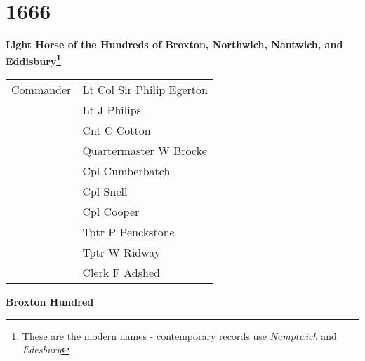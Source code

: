 \chapter*{1666}

\vspace*{10mm}

\begin{center}
  \Large
  \textbf{Light Horse of the Hundreds of Broxton, Northwich, Nantwich, and Eddisbury\footnote{These are the modern names - contemporary records use \textit{Namptwich} and \textit{Edesbury}}}
\end{center}

\begin{center}
  \begin{tabular}{rl}
    Commander & Lt Col Sir Philip Egerton \\
    & Lt J Philips \\
    & Cnt C Cotton \\
    & Quartermaster W Brocke \\
    & Cpl Cumberbatch \\
    & Cpl Snell \\
    & Cpl Cooper \\
    & Tptr P Penckstone \\
    & Tptr W Ridway \\
    & Clerk F Adshed \\
  \end{tabular}
\end{center}

\pagebreak

\vspace*{10mm}

\begin{center}
  \Large
  \textbf{Broxton Hundred}
\end{center}

